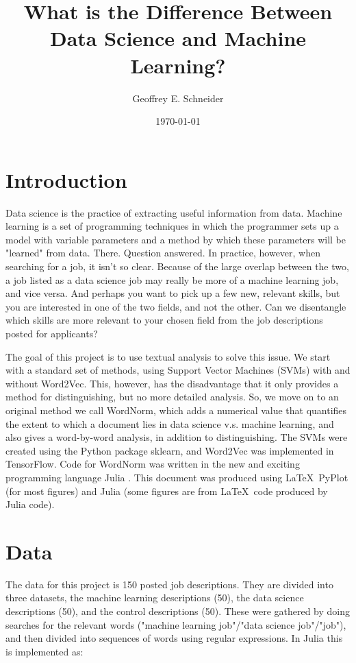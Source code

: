 \documentclass[12pt]{article}
\title{What is the Difference Between Data Science and Machine Learning?}
\date{\today}
\author{Geoffrey E. Schneider}
\begin{document}
\maketitle
\section{Introduction} Data science is the practice of extracting useful information from data. Machine learning is a set of programming techniques in which the programmer sets up a model with variable parameters and a method by which these parameters will be "learned" from data. There. Question answered. In practice, however, when searching for a job, it isn't so clear. Because of the large overlap between the two, a job listed as a data science job may really be more of a machine learning job, and vice versa. And perhaps you want to pick up a few new, relevant skills, but you are interested in one of the two fields, and not the other. Can we disentangle which skills are more relevant to your chosen field from the job descriptions posted for applicants?

The goal of this project is to use textual analysis to solve this issue. We start with a standard set of methods, using Support Vector Machines (SVMs) with and without Word2Vec. This, however, has the disadvantage that it only provides a method for distinguishing, but no more detailed analysis. So, we move on to an original method we call WordNorm, which adds a numerical value that quantifies the extent to which a document lies in data science v.s. machine learning, and also gives a word-by-word analysis, in addition to distinguishing. The SVMs were created using the Python package sklearn, and Word2Vec was implemented in TensorFlow. Code for WordNorm was written in the new and exciting programming language Julia \cite{Julia}. This document was produced using \LaTeX\, PyPlot (for most figures) and Julia (some figures are from \LaTeX\ code produced by Julia code).

\section{Data} The data for this project is 150 posted job descriptions\cite{LinkedIn}. They are divided into three datasets, the machine learning descriptions (50), the data science descriptions (50), and the control descriptions (50). These were gathered by doing searches for the relevant words ("machine learning job"/"data science job"/"job"), and then divided into sequences of words using regular expressions. In Julia this is implemented as:
\end{document}
